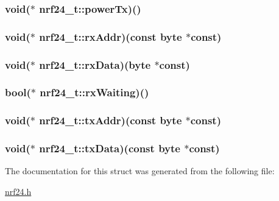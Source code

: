 \hypertarget{a00007_a917c8f18519ee2eb701cb9f5dc06ee5b}{
\subsubsection[{power\-Tx}]{\setlength{\rightskip}{0pt plus 5cm}void($\ast$ nrf24\-\_\-t\-::power\-Tx)()}}\label{a00007_a917c8f18519ee2eb701cb9f5dc06ee5b}
\hypertarget{a00007_a633b3f1cbb28dc44cf5cbef3a21e1a52}{
\subsubsection[{rx\-Addr}]{\setlength{\rightskip}{0pt plus 5cm}void($\ast$ nrf24\-\_\-t\-::rx\-Addr)(const {\bf byte} $\ast$const)}}\label{a00007_a633b3f1cbb28dc44cf5cbef3a21e1a52}
\hypertarget{a00007_a3048d3b01b01b32cbbfb59745cab6e0a}{
\subsubsection[{rx\-Data}]{\setlength{\rightskip}{0pt plus 5cm}void($\ast$ nrf24\-\_\-t\-::rx\-Data)({\bf byte} $\ast$const)}}\label{a00007_a3048d3b01b01b32cbbfb59745cab6e0a}
\hypertarget{a00007_a4b6d281391ba445efcd076d653ce0af4}{
\subsubsection[{rx\-Waiting}]{\setlength{\rightskip}{0pt plus 5cm}bool($\ast$ nrf24\-\_\-t\-::rx\-Waiting)()}}\label{a00007_a4b6d281391ba445efcd076d653ce0af4}
\hypertarget{a00007_a26bad46d3c1a94c7b197f08a1d4df3bf}{
\subsubsection[{tx\-Addr}]{\setlength{\rightskip}{0pt plus 5cm}void($\ast$ nrf24\-\_\-t\-::tx\-Addr)(const {\bf byte} $\ast$const)}}\label{a00007_a26bad46d3c1a94c7b197f08a1d4df3bf}
\hypertarget{a00007_a90fd0d2431d43f6afc45de6ea9524eb1}{
\subsubsection[{tx\-Data}]{\setlength{\rightskip}{0pt plus 5cm}void($\ast$ nrf24\-\_\-t\-::tx\-Data)(const {\bf byte} $\ast$const)}}\label{a00007_a90fd0d2431d43f6afc45de6ea9524eb1}


The documentation for this struct was generated from the following file\-:\begin{DoxyCompactItemize}
\item 
\hyperlink{a00013}{nrf24.\-h}\end{DoxyCompactItemize}

